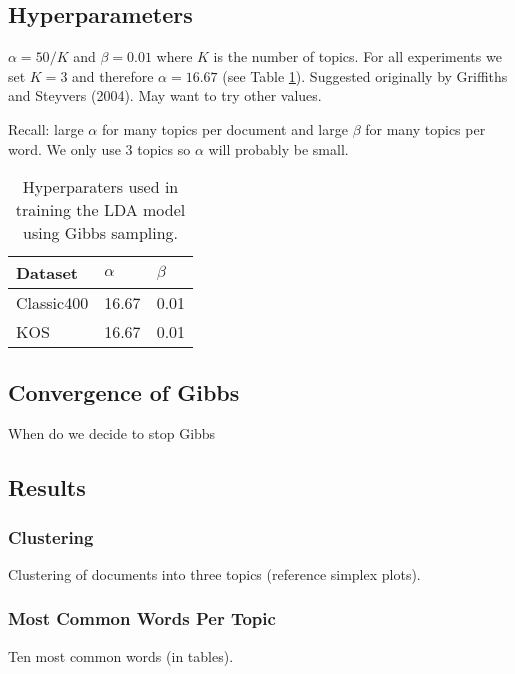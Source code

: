 \documentclass[10pt]{article}
\newcommand{\ra}[1]{\renewcommand{\arraystretch}{#1}}
\begin{document}
%
%
\subsection{Hyperparameters}
$\alpha = 50 / K$ and $\beta=0.01$ where $K$ is the number of topics. For all experiments we set $K=3$ and therefore $\alpha = 16.67$ (see Table \ref{tab:hyperparameters}). Suggested originally by Griffiths and Steyvers (2004). May want to try other values.

Recall: large $\alpha$ for many topics per document and large $\beta$ for many topics per word. We only use 3 topics so $\alpha$ will probably be small.

\begin{table}
    \centering
    \ra{1.2}
    \begin{tabular}{@{} l l l @{}}
        \toprule
        \bf{Dataset} & $\alpha$ & $\beta$ \\
        \midrule
        Classic400 & 16.67 & 0.01 \\
        KOS        & 16.67 & 0.01 \\
        \bottomrule
    \end{tabular}
    \caption{Hyperparaters used in training the LDA model using Gibbs sampling.}
    \label{tab:hyperparameters}
\end{table}


%
%
\subsection{Convergence of Gibbs}
When do we decide to stop Gibbs


%
%
\subsection{Results}

\subsubsection{Clustering}
Clustering of documents into three topics (reference simplex plots).

\subsubsection{Most Common Words Per Topic}
Ten most common words (in tables).
\end{document}
